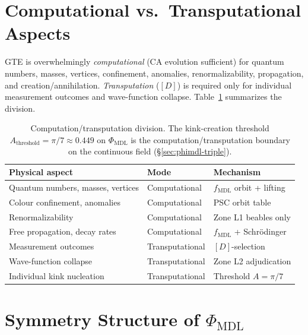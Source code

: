 \documentclass[12pt,letterpaper]{article}
\newcommand{\fmdl}{f_{\mathrm{MDL}}}
\newcommand{\Dclass}{[D]}
\begin{document}
\section{Computational vs.\ Transputational Aspects}
\label{sec:ctd}

GTE is overwhelmingly \emph{computational} (CA evolution sufficient) for
quantum numbers, masses, vertices, confinement, anomalies, renormalizability,
propagation, and creation/annihilation.
\emph{Transputation} ($\Dclass$) is required only for individual measurement
outcomes and wave-function collapse.
Table~\ref{tab:ctd} summarizes the division.

\begin{table}[h!]
\centering
\small
\begin{tabular}{p{} p{} p{}}
\toprule
\textbf{Physical aspect} & \textbf{Mode} & \textbf{Mechanism} \\
\midrule
Quantum numbers, masses, vertices & Computational & $\fmdl$ orbit + lifting \\
Colour confinement, anomalies & Computational & PSC orbit table \\
Renormalizability & Computational & Zone L1 beables only \\
Free propagation, decay rates & Computational & $\fmdl$ + Schr\"odinger \\
Measurement outcomes & Transputational & $\Dclass$-selection \\
Wave-function collapse & Transputational & Zone L2 adjudication \\
Individual kink nucleation & Transputational & Threshold $A = \pi/7$ \\
\bottomrule
\end{tabular}
\caption{Computation/transputation division.
The kink-creation threshold $A_{\mathrm{threshold}} = \pi/7 \approx 0.449$
on $\Phi_{\mathrm{MDL}}$ is the computation/transputation boundary on the
continuous field (\S\ref{sec:phimdl-triple}).}
\label{tab:ctd}
\end{table}



\section{Symmetry Structure of \texorpdfstring{$\Phi_{\mathrm{MDL}}$}{Phi\_MDL}}
\label{sec:symmetry-phimdl}
\end{document}
